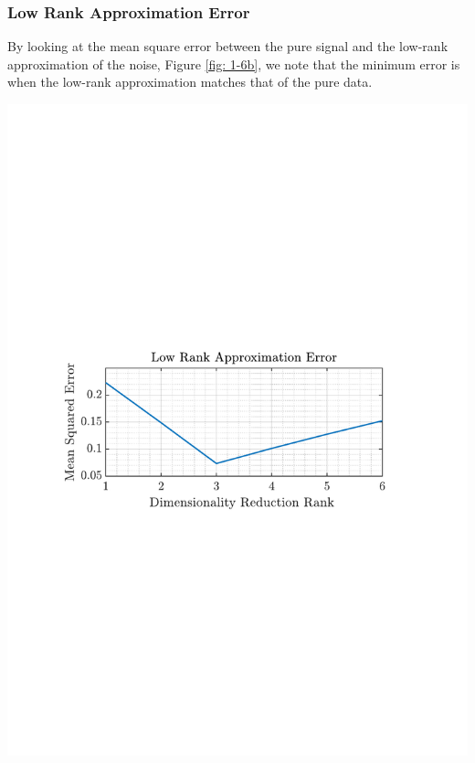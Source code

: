 \documentclass[12pt]{article}
\begin{document}
	 	
	 	\subsubsection{Low Rank Approximation Error}
		 	\begin{minipage}[b]{0.49\textwidth}
			By looking at the mean square error between the pure signal and the low-rank approximation of the noise, Figure \ref{fig: 1-6b}, we note that the minimum error is when the low-rank approximation matches that of the pure data.
			\end{minipage}%
			\begin{minipage}{0.04\textwidth}
				\hspace*{0.04\textwidth}
			\end{minipage}%
			\begin{minipage}{0.49\textwidth}
				\centering
				\includegraphics[trim={2.2cm 11.2cm 3.15cm  11.2cm}, clip, width=\textwidth]{../MATLAB/figures/q1_6b_fig01.pdf} 
				\captionsetup{justification=centering}
				\label{fig: 1-6b}
			\end{minipage}%
	
\end{document}
